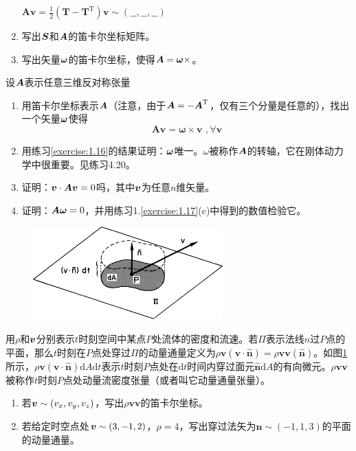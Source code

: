 \begin{exercise}
\begin{enumerate}
        $\boldsymbol{Av}=\frac{1}{2}\left( \boldsymbol{T}-\boldsymbol{T}^{\mathrm{T}} \right) \boldsymbol{v}\sim \left( \_\_,\_\_,\_\_ \right) $
        \item 写出$\boldsymbol{S}$和$\boldsymbol{A}$的笛卡尔坐标矩阵。
        \item 写出矢量$\boldsymbol{\omega}$的笛卡尔坐标，使得$\boldsymbol{A}=\boldsymbol{\omega}\times$。
    \end{enumerate}
    \item 设$\boldsymbol{A}$表示任意三维反对称张量
    \begin{enumerate}
        \item 用笛卡尔坐标表示$\boldsymbol{A}$（注意，由于$\boldsymbol{A}=-\boldsymbol{A}^{\mathrm{T}}$，仅有三个分量是任意的），找出一个矢量$\boldsymbol{\omega }$使得
        \begin{equation*}
            \boldsymbol{Av}=\boldsymbol{\omega }\times \boldsymbol{v}\,\, ,\forall \boldsymbol{v}
        \end{equation*}
        \item 用练习\ref{exercise:1.16}的结果证明：$\boldsymbol{\omega }$唯一。$\omega $被称作$\boldsymbol{A}$的转轴，它在刚体动力学中很重要。见练习4.20。
        \item 证明：$\boldsymbol{v}\cdot \boldsymbol{Av}=0$吗，其中$\boldsymbol{v}$为任意$n$维矢量。
        \item 证明：$\boldsymbol{A\omega}=0$，并用练习1.\ref{exercise:1.17}(c)中得到的数值检验它。
    \end{enumerate}

    \begin{figure}[htbp]
        \centering
        \includegraphics[width=0.65\textwidth]{./image/1.9.png}
        \caption{}
        \label{fig:1.9}
    \end{figure}

    \item 用$\rho $和$\boldsymbol{v}$分别表示$t$时刻空间中某点$P$处流体的密度和流速。若$\Pi $表示法线$n$过$P$点的平面，那么$t$时刻在$P$点处穿过$\Pi$的动量通量定义为$\rho \boldsymbol{v}\left( \boldsymbol{v}\cdot \widehat{\boldsymbol{n}} \right) =\rho \boldsymbol{vv}\left( \widehat{\boldsymbol{n}} \right) $。如图\ref{fig:1.9}所示，$\rho \boldsymbol{v}\left( \boldsymbol{v}\cdot \widehat{\boldsymbol{n}} \right) \mathrm{d}A\mathrm{d}t$表示$t$时刻$P$点处在$\mathrm{d}t$时间内穿过面元$\widehat{\boldsymbol{n}}\mathrm{d}A$的有向微元。$\rho \boldsymbol{vv}$被称作$t$时刻$P$点处动量流密度张量（或者叫它动量通量张量）。
    \begin{enumerate}
        \item 若$\boldsymbol{v}\sim (v_x,v_y,v_z)$，写出$\rho \boldsymbol{vv}$的笛卡尔坐标。
        \item 若给定时空点处$\boldsymbol{v}\sim (3,-1,2)$，$\rho =4$，写出穿过法矢为$\boldsymbol{n}\sim \left( -1,1,3 \right) $的平面的动量通量。
    \end{enumerate}


\end{exercise}
